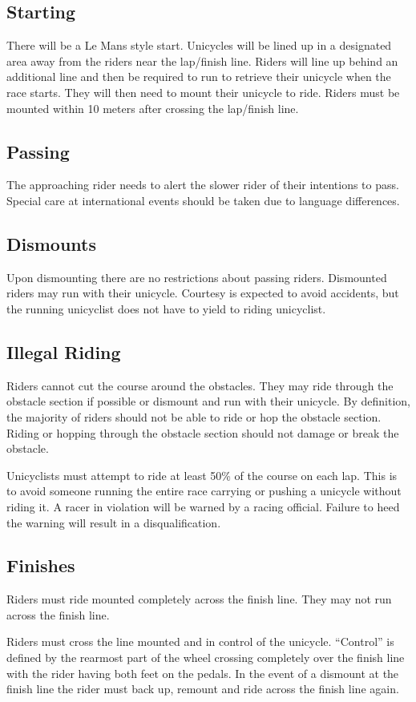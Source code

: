 \subsection{Starting}

There will be a Le Mans style start.
Unicycles will be lined up in a designated area away from the riders near the lap/finish line.
Riders will line up behind an additional line and then be required to run to retrieve their unicycle when the race starts.
They will then need to mount their unicycle to ride.
Riders must be mounted within 10 meters after crossing the lap/finish line.

\subsection{Passing}

The approaching rider needs to alert the slower rider of their intentions to pass.
Special care at international events should be taken due to language differences.

\subsection{Dismounts}

Upon dismounting there are no restrictions about passing riders.
Dismounted riders may run with their unicycle.
Courtesy is expected to avoid accidents, but the running unicyclist does not have to yield to riding unicyclist.

\subsection{Illegal Riding}

Riders cannot cut the course around the obstacles.
They may ride through the obstacle section if possible or dismount and run with their unicycle.
By definition, the majority of riders should not be able to ride or hop the obstacle section.
Riding or hopping through the obstacle section should not damage or break the obstacle.

Unicyclists must attempt to ride at least 50\% of the course on each lap.
This is to avoid someone running the entire race carrying or pushing a unicycle without riding it.
A racer in violation will be warned by a racing official.
Failure to heed the warning will result in a disqualification.

\subsection{Finishes}

Riders must ride mounted completely across the finish line.
They may not run across the finish line.

Riders must cross the line mounted and in control of the unicycle.
``Control'' is defined by the rearmost part of the wheel crossing completely over the finish line with the rider having both feet on the pedals.
In the event of a dismount at the finish line the rider must back up, remount and ride across the finish line again.
